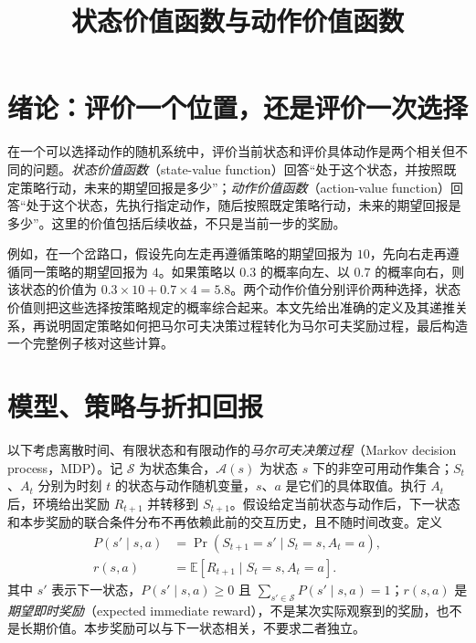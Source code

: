 \documentclass[UTF8,12pt,a4paper,fontset=fandol]{ctexart}
\title{状态价值函数与动作价值函数}
\author{}
\date{}
\begin{document}
\maketitle

\section{绪论：评价一个位置，还是评价一次选择}
\label{sec:value-intro}

在一个可以选择动作的随机系统中，评价当前状态和评价具体动作是两个相关但不同的问题。\emph{状态价值函数}（state-value function）回答“处于这个状态，并按照既定策略行动，未来的期望回报是多少”；\emph{动作价值函数}（action-value function）回答“处于这个状态，先执行指定动作，随后按照既定策略行动，未来的期望回报是多少”。这里的价值包括后续收益，不只是当前一步的奖励。

例如，在一个岔路口，假设先向左走再遵循策略的期望回报为 $10$，先向右走再遵循同一策略的期望回报为 $4$。如果策略以 $0.3$ 的概率向左、以 $0.7$ 的概率向右，则该状态的价值为 $0.3\times10+0.7\times4=5.8$。两个动作价值分别评价两种选择，状态价值则把这些选择按策略规定的概率综合起来。本文先给出准确的定义及其递推关系，再说明固定策略如何把马尔可夫决策过程转化为马尔可夫奖励过程，最后构造一个完整例子核对这些计算。

\section{模型、策略与折扣回报}
\label{sec:value-model}

以下考虑离散时间、有限状态和有限动作的\emph{马尔可夫决策过程}（Markov decision process，MDP）。记 $\mathcal S$ 为状态集合，$\mathcal A(s)$ 为状态 $s$ 下的非空可用动作集合；$S_t$、$A_t$ 分别为时刻 $t$ 的状态与动作随机变量，$s$、$a$ 是它们的具体取值。执行 $A_t$ 后，环境给出奖励 $R_{t+1}$ 并转移到 $S_{t+1}$。假设给定当前状态与动作后，下一状态和本步奖励的联合条件分布不再依赖此前的交互历史，且不随时间改变。定义
\begin{equation}
  \begin{aligned}
    P(s'\mid s,a)&=\Pr(S_{t+1}=s'\mid S_t=s,A_t=a),\\
    r(s,a)&=\mathbb E[R_{t+1}\mid S_t=s,A_t=a].
  \end{aligned}
  \label{eq:value-model}
\end{equation}
其中 $s'$ 表示下一状态，$P(s'\mid s,a)\geq0$ 且 $\sum_{s'\in\mathcal S}P(s'\mid s,a)=1$；$r(s,a)$ 是\emph{期望即时奖励}（expected immediate reward），不是某次实际观察到的奖励，也不是长期价值。本步奖励可以与下一状态相关，不要求二者独立。
\end{document}
